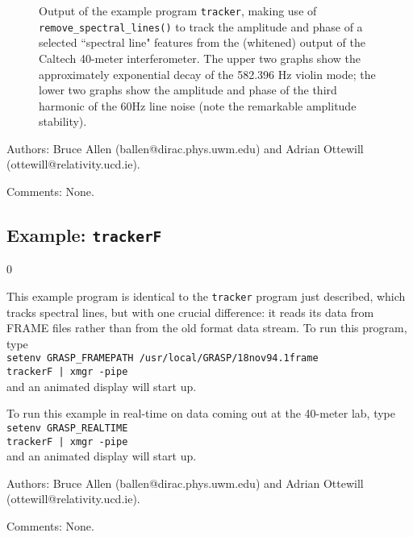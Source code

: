 \begin{figure}[hb]
\begin{center}
\caption{ \label{f:tracker} 
Output of the example program {\tt tracker}, making use of {\tt
remove\_spectral\_lines()} to track the amplitude and phase of a selected
``spectral line" features from the (whitened) output of the Caltech
40-meter interferometer.  The upper two graphs show the approximately
exponential decay of the 582.396 Hz violin mode; the lower two graphs show
the amplitude and phase of the third harmonic of the 60Hz line noise
(note the remarkable amplitude stability).}
\end{center}
\end{figure}

\begin{description}
\item{Authors:}
Bruce Allen (ballen@dirac.phys.uwm.edu) and Adrian Ottewill
(ottewill@relativity.ucd.ie).
\item{Comments:}
None.
\end{description}
\clearpage


\subsection{Example: {\tt trackerF}}
\setcounter{equation}0

This example program is identical to the {\tt tracker} program just
described, which tracks spectral lines, but with one crucial difference:
it reads its data from FRAME files rather than from the old format
data stream.  To run this program, type\\
{\tt setenv GRASP\_FRAMEPATH /usr/local/GRASP/18nov94.1frame}\\
{\tt trackerF | xmgr -pipe}\\
and an animated display will start up.

To run this example in real-time on data coming out at the 40-meter
lab, type\\
{\tt setenv GRASP\_REALTIME}\\
{\tt trackerF | xmgr -pipe}\\
and an animated display will start up.


\begin{description}
\item{Authors:}
Bruce Allen (ballen@dirac.phys.uwm.edu) and Adrian Ottewill
(ottewill@relativity.ucd.ie).
\item{Comments:}
None.
\end{description}

